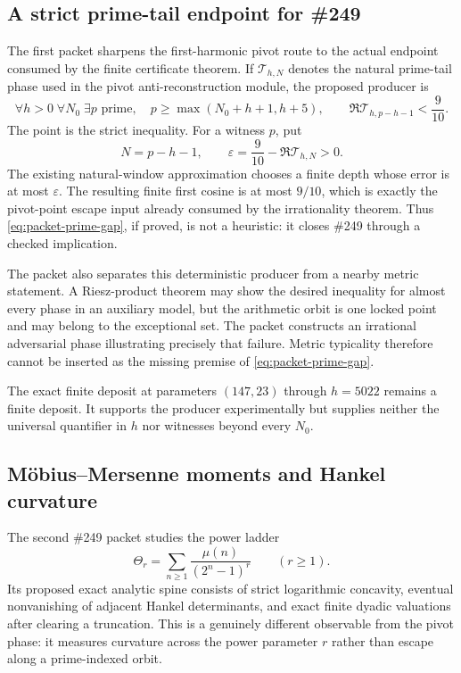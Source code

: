 \documentclass[11pt]{article}
\theoremstyle{definition}
\theoremstyle{remark}
\begin{document}
\subsection{A strict prime-tail endpoint for \#249}
\label{sec:packet-prime-tail}

The first packet sharpens the first-harmonic pivot route to the actual endpoint
consumed by the finite certificate theorem.  If
\(\mathcal T_{h,N}\) denotes the natural prime-tail phase used in the
pivot anti-reconstruction module, the proposed producer is
\[
 \forall h>0\;\forall N_0\;\exists p\text{ prime},\quad
 p\ge\max(N_0+h+1,h+5),\qquad
 \Re\mathcal T_{h,p-h-1}<\frac9{10}.
 \tag{P}\label{eq:packet-prime-gap}
\]
The point is the strict inequality.  For a witness $p$, put
\[
 N=p-h-1,
 \qquad
 \varepsilon=\frac9{10}-\Re\mathcal T_{h,N}>0.
\]
The existing natural-window approximation chooses a finite depth whose error
is at most $\varepsilon$.  The resulting finite first cosine is at most
$9/10$, which is exactly the pivot-point escape input already consumed by the
irrationality theorem.  Thus \eqref{eq:packet-prime-gap}, if proved, is not a
heuristic: it closes \#249 through a checked implication.

The packet also separates this deterministic producer from a nearby metric
statement.  A Riesz-product theorem may show the desired inequality for almost
every phase in an auxiliary model, but the arithmetic orbit is one locked
point and may belong to the exceptional set.  The packet constructs an
irrational adversarial phase illustrating precisely that failure.  Metric
typicality therefore cannot be inserted as the missing premise of
\eqref{eq:packet-prime-gap}.

The exact finite deposit at parameters $(147,23)$ through $h=5022$ remains a
finite deposit.  It supports the producer experimentally but supplies neither
the universal quantifier in $h$ nor witnesses beyond every $N_0$.

\subsection{M\"obius--Mersenne moments and Hankel curvature}
\label{sec:packet-hankel}

The second \#249 packet studies the power ladder
\[
 \Theta_r=\sum_{n\ge1}\frac{\mu(n)}{(2^n-1)^r}
 \qquad(r\ge1).
\]
Its proposed exact analytic spine consists of strict logarithmic concavity,
eventual nonvanishing of adjacent Hankel determinants, and exact finite dyadic
valuations after clearing a truncation.  This is a genuinely different
observable from the pivot phase: it measures curvature across the power
parameter $r$ rather than escape along a prime-indexed orbit.
\end{document}
